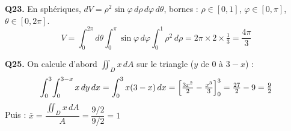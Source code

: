 \documentclass[11pt,a4paper]{article}
\begin{document}
\smallskip
\noindent\textbf{Q23.} En sphériques, $dV=\rho^2\sin\varphi\,d\rho\,d\varphi\,d\theta$, bornes : $\rho\in[0,1]$, $\varphi\in[0,\pi]$, $\theta\in[0,2\pi]$.
$$V = \int_0^{2\pi}\!\!d\theta\int_0^\pi\!\sin\varphi\,d\varphi\int_0^1\rho^2\,d\rho = 2\pi \times 2 \times \tfrac{1}{3} = \boxed{\dfrac{4\pi}{3}}$$

\smallskip
\noindent\textbf{Q25.} On calcule d'abord $\iint_D x\,dA$ sur le triangle ($y$ de $0$ à $3-x$) :
$$\int_0^3\!\int_0^{3-x}x\,dy\,dx = \int_0^3 x(3-x)\,dx = \Bigl[{\tfrac{3x^2}{2}-\tfrac{x^3}{3}}\Bigr]_0^3 = \tfrac{27}{2}-9 = \tfrac{9}{2}$$
Puis : $\bar{x} = \dfrac{\iint_D x\,dA}{A} = \dfrac{9/2}{9/2} = \boxed{1}$
\end{document}
